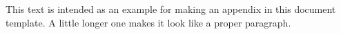 This text is intended as an example for making an appendix in this document template. A little longer one makes it look like a proper paragraph.